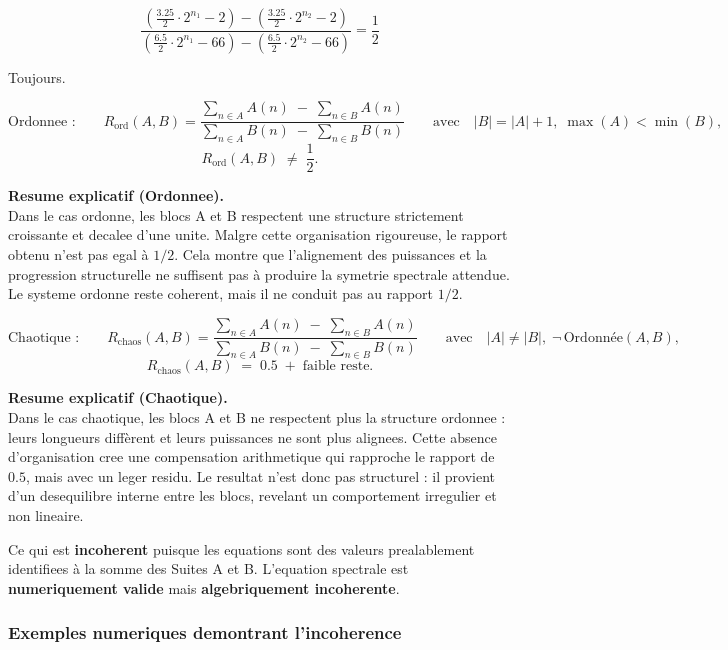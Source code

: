 \documentclass[a4paper,11pt]{article}
\begin{document}
\[
\frac{
\left(\frac{3.25}{2} \cdot 2^{n_{1}} - 2\right)
-
\left(\frac{3.25}{2} \cdot 2^{n_{2}} - 2\right)
}{
\left(\frac{6.5}{2} \cdot 2^{n_{1}} - 66\right)
-
\left(\frac{6.5}{2} \cdot 2^{n_{2}} - 66\right)
}
= \frac{1}{2}
\]

Toujours.

\[
\text{Ordonnee :}\qquad
R_{\mathrm{ord}}(A,B)
=
\frac{\displaystyle \sum_{n \in A} A(n)\;-\;\sum_{n \in B} A(n)}
     {\displaystyle \sum_{n \in A} B(n)\;-\;\sum_{n \in B} B(n)}
\qquad\text{avec}\quad |B| = |A| + 1,\; \max(A) < \min(B),
\]
\[
R_{\mathrm{ord}}(A,B) \;\neq\; \frac{1}{2}.
\]

\textbf{Resume explicatif (Ordonnee).} \\
Dans le cas ordonne, les blocs A et B respectent une structure strictement croissante
et decalee d'une unite. Malgre cette organisation rigoureuse, le rapport obtenu n'est
pas egal à $1/2$. Cela montre que l'alignement des puissances et la progression
structurelle ne suffisent pas à produire la symetrie spectrale attendue. Le systeme
ordonne reste coherent, mais il ne conduit pas au rapport $1/2$.

\[
\text{Chaotique :}\qquad
R_{\mathrm{chaos}}(A,B)
=
\frac{\displaystyle \sum_{n \in A} A(n)\;-\;\sum_{n \in B} A(n)}
     {\displaystyle \sum_{n \in A} B(n)\;-\;\sum_{n \in B} B(n)}
\qquad\text{avec}\quad |A| \neq |B|,\; \neg\,\text{Ordonnée}(A,B),
\]
\[
R_{\mathrm{chaos}}(A,B) \;=\; 0.5 \;+\; \text{faible reste}.
\]

\textbf{Resume explicatif (Chaotique).} \\
Dans le cas chaotique, les blocs A et B ne respectent plus la structure ordonnee :
leurs longueurs diffèrent et leurs puissances ne sont plus alignees. Cette absence
d'organisation cree une compensation arithmetique qui rapproche le rapport de $0.5$,
mais avec un leger residu. Le resultat n'est donc pas structurel : il provient d'un
desequilibre interne entre les blocs, revelant un comportement irregulier et non lineaire.

\begin{tcolorbox}[colback=red!5,colframe=red!75,title={\textbf{Attention : Incoherence algebrique}}]
Ce qui est \textbf{incoherent} puisque les equations sont des valeurs prealablement identifiees à la somme des Suites A et B. L'equation spectrale est \textbf{numeriquement valide} mais \textbf{algebriquement incoherente}.
\end{tcolorbox}

\subsubsection{Exemples numeriques demontrant l'incoherence}
\end{document}
